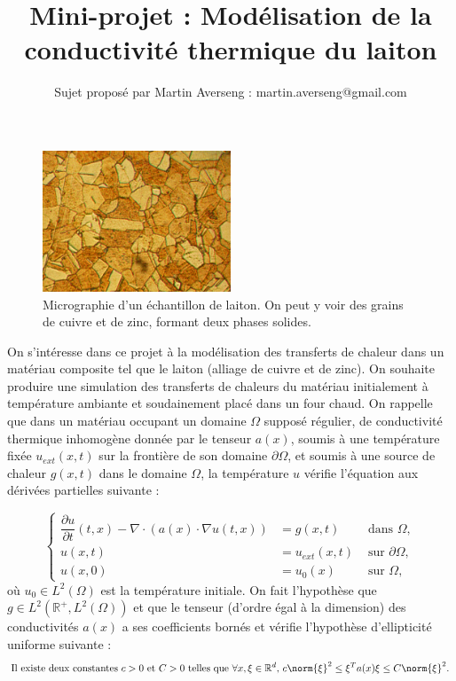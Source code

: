 \documentclass[11pt,a4paper]{article}
\title{Mini-projet : Modélisation de la conductivité thermique du laiton}
\author{Sujet proposé par Martin Averseng : martin.averseng@gmail.com}
\begin{document}
\maketitle

\begin{figure}
\begin{center}
\includegraphics[width=0.5\textwidth]{LaitonMicrostruct.jpg} 
\end{center}
\caption{Micrographie d'un échantillon de laiton. On peut y voir des grains de cuivre et de zinc, formant deux phases solides. }
\end{figure}

On s'intéresse dans ce projet à la modélisation des transferts de chaleur dans un matériau composite tel que le laiton (alliage de cuivre et de zinc). On souhaite produire une simulation des transferts de chaleurs du  matériau initialement à température ambiante et soudainement placé dans un four chaud. On rappelle que dans un matériau occupant un domaine $\Omega$ supposé régulier, de conductivité thermique inhomogène donnée par le tenseur $a(x)$, soumis à une température fixée $u_{ext}(x,t)$ sur la frontière de son domaine $\partial \Omega$, et soumis à une source de chaleur $g(x,t)$ dans le domaine $\Omega$, la température $u$ vérifie l'équation aux dérivées partielles suivante : 

\begin{equation}
\left\{
\begin{array}{rll}
\dfrac{\partial u}{\partial t}(t,x) - \nabla \cdot (a(x)\cdot  \nabla u (t,x)) &= g(x,t) & \text{ dans } \Omega,\\
u(x,t) &= u_{ext}(x,t) & \text{ sur } \partial \Omega, \\
u(x,0) &= u_0(x) & \text{ sur } \Omega,
\end{array}\right.
\label{EqChaleurInhomogene}
\end{equation}
où $u_0 \in L^2(\Omega)$ est la température initiale. On fait l'hypothèse que $g \in L^2(\mathbb{R}^+,L^2(\Omega))$ et que  le tenseur (d'ordre égal à la dimension) des conductivités $a(x)$ a ses coefficients bornés et vérifie l'hypothèse d'ellipticité uniforme suivante : \\
\begin{equation}
\label{CoerciviteUniforme}
\text{Il existe deux constantes $c>0$ et $C>0$ telles que $\forall x,\xi \in \mathbb{R}^d$, $ c \norm{\xi}^2 \leq \xi^T a(x) \xi \leq C \norm{\xi}^2$.}
\end{equation}
\end{document}
